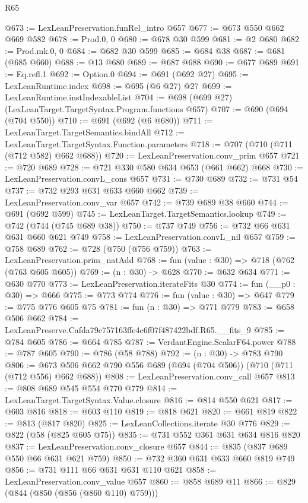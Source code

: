 \begin{lexlean}{R65}
\begin{coremodule}
@673 := LexLeanPreservation.funRel_intro @657
@677 := @673 @550 @662 @669 @582
@678 := Prod.{0, 0}
@680 := @678 @30 @599
@681 := @2 @680
@682 := Prod.mk.{0, 0}
@684 := @682 @30 @599
@685 := @684 @38
@687 := @681 (@685 @660)
@688 := @13 @680
@689 := @687 @688
@690 := @677 @689
@691 := Eq.refl.{1}
@692 := Option.{0}
@694 := @691 (@692 @27)
@695 := LexLeanRuntime.index
@698 := @695 (@6 @27) @27
@699 := LexLeanRuntime.instIndexableList
@704 := @698 (@699 @27) (LexLeanTarget.TargetSyntax.Program.functions @657)
@707 := @690 (@694 (@704 @550))
@710 := @691 (@692 (@6 @680))
@711 := LexLeanTarget.TargetSemantics.bindAll
@712 := LexLeanTarget.TargetSyntax.Function.parameters
@718 := @707 (@710 (@711 (@712 @582) @662 @688))
@720 := LexLeanPreservation.conv_prim @657
@721 := @720 @689
@728 := @721 @330 @580 @634 @653 (@661 @662) @668
@730 := LexLeanPreservation.convL_cons @657
@731 := @730 @689
@732 := @731 @54
@737 := @732 @293 @631 @633 @660 @662
@739 := LexLeanPreservation.conv_var @657
@742 := @739 @689 @38 @660
@744 := @691 (@692 @599)
@745 := LexLeanTarget.TargetSemantics.lookup
@749 := @742 (@744 (@745 @689 @38))
@750 := @737 @749
@756 := @732 @66 @631 @631 @660 @621 @749
@758 := LexLeanPreservation.convL_nil @657
@759 := @758 @689
@762 := @728 (@750 (@756 @759))
@763 := LexLeanPreservation.prim_natAdd
@768 := fun (value : @30) => @718 (@762 (@763 @605 @605))
@769 := (n : @30) -> @628
@770 := @632 @634
@771 := @630 @770
@773 := LexLeanPreservation.iterateFits @30
@774 := fun (__p0 : @30) => @666
@775 := @773 @774
@776 := fun (value : @30) => @647
@779 := @775 @776 @605 @75
@781 := fun (n : @30) => @771 @779
@783 := @658 @506 @662
@784 := LexLeanPreserve.Cafda79c757163ffe4c6f07f487422bdf.R65.__fits_9
@785 := @784 @605
@786 := @664 @785
@787 := VerdantEngine.ScalarF64.power
@788 := @787 @605
@790 := @786 (@58 @788)
@792 := (n : @30) -> @783 @790
@806 := @673 @506 @662 @790 @556 @689 (@694 (@704 @506)) (@710 (@711 (@712 @556) @662 @688))
@808 := LexLeanPreservation.conv_call @657
@813 := @808 @689 @545 @554 @770 @779
@814 := LexLeanTarget.TargetSyntax.Value.closure
@816 := @814 @550 @621
@817 := @603 @816
@818 := @603 @110
@819 := @818 @621
@820 := @661 @819
@822 := @813 (@817 @820)
@825 := LexLeanCollections.iterate @30 @776
@829 := @822 (@58 (@825 @605 @75))
@835 := @731 @552 @361 @631 @634 @816 @820
@837 := LexLeanPreservation.conv_closure @657
@844 := @835 (@837 @689 @550 @66 @631 @621 @759)
@850 := @732 @360 @631 @633 @660 @819 @749
@856 := @731 @111 @66 @631 @631 @110 @621
@858 := LexLeanPreservation.conv_value @657
@860 := @858 @689 @11
@866 := @829 (@844 (@850 (@856 (@860 @110) @759)))

\end{coremodule}
\end{lexlean}
